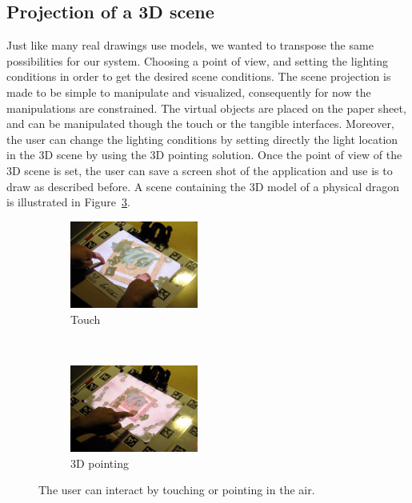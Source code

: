 \documentclass{article}
\begin{document}
\subsection{Projection of a 3D scene}
Just like many real drawings use models, we wanted to transpose the same possibilities for our system. Choosing a point of view, and setting the lighting conditions in order to get the desired scene conditions. 
The scene projection is made to be simple to manipulate and visualized, consequently for now the manipulations are constrained. The virtual objects are placed on the paper sheet, and can be manipulated though the touch or the tangible interfaces. Moreover, the user can change the lighting conditions by setting directly the light location in the 3D scene by using the 3D pointing solution. Once the point of view of the 3D scene is set, the user can save a screen shot of the application and use is to draw as described before. A scene containing the 3D model of a physical dragon is illustrated in Figure~\ref{fig:inter}.


\begin{figure}[!h]
        \begin{subfigure}[b]{4.2cm}
                \centering
                \includegraphics[width=4.2cm]{Still2}
                \caption{Touch}
                \label{fig:touch}
        \end{subfigure}%
        ~ %
        \begin{subfigure}[b]{0.25\textwidth}
                \centering
                \includegraphics[width=4.2cm]{Still1}
                \caption{3D pointing}
                \label{fig:point}
        \end{subfigure}
        \caption{The user can interact by touching or pointing in the air.}
        \label{fig:inter}
\end{figure}
\end{document}
